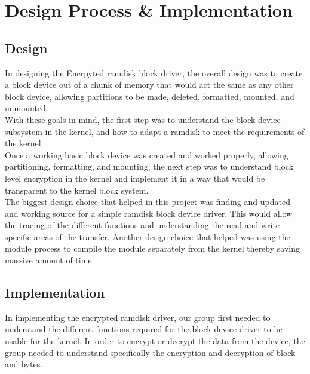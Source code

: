 \documentclass[letterpaper,10pt,titlepage]{article}
\begin{document}
%
%

\section{Design Process \& Implementation}
\subsection*{Design}

In designing the Encrpyted ramdisk block driver, the overall design was to create a block device out of a chunk of memory that would act the same as any other block device, allowing partitions to be made, deleted, formatted, mounted, and unmounted.\\

With these goals in mind, the first step was to understand the block device subsystem in the kernel, and how to adapt a ramdisk to meet the requirements of the kernel.\\

Once a working basic block device was created and worked properly, allowing partitioning, formatting, and mounting, the next step was to understand block level encryption in the kernel and implement it in a way that would be transparent to the kernel block system.\\

The biggest design choice that helped in this project was finding and updated and working source for a simple ramdisk block device driver. This would allow the tracing of the different functions and understanding the read and write specific areas of the transfer. Another design choice that helped was using the module process to compile the module separately from the kernel thereby saving massive amount of time.

\subsection*{Implementation}

In implementing the encrypted ramdisk driver, our group first needed to understand the different functions required for the block device driver to be usable for the kernel. In order to encrypt or decrypt the data from the device, the group needed to understand specifically the encryption and decryption of block and bytes.\\
\end{document}
